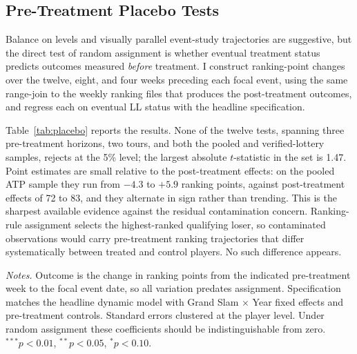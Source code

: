 \subsection{Pre-Treatment Placebo Tests}
\label{sec:robustness_placebo}

Balance on levels and visually parallel event-study trajectories are suggestive, but the direct test of random assignment is whether eventual treatment status predicts outcomes measured \textit{before} treatment. I construct ranking-point changes over the twelve, eight, and four weeks preceding each focal event, using the same range-join to the weekly ranking files that produces the post-treatment outcomes, and regress each on eventual LL status with the headline specification.

Table~\ref{tab:placebo} reports the results. None of the twelve tests, spanning three pre-treatment horizons, two tours, and both the pooled and verified-lottery samples, rejects at the 5\% level; the largest absolute $t$-statistic in the set is 1.47. Point estimates are small relative to the post-treatment effects: on the pooled ATP sample they run from $-4.3$ to $+5.9$ ranking points, against post-treatment effects of 72 to 83, and they alternate in sign rather than trending. This is the sharpest available evidence against the residual contamination concern. Ranking-rule assignment selects the highest-ranked qualifying loser, so contaminated observations would carry pre-treatment ranking trajectories that differ systematically between treated and control players. No such difference appears.

\begin{table}[htbp]
\centering
\caption{Pre-Treatment Placebo Tests}
\label{tab:placebo}
\begin{threeparttable}
\small

\begin{tablenotes}
\footnotesize
\item \textit{Notes.} Outcome is the change in ranking points from the indicated pre-treatment week to the focal event date, so all variation predates assignment. Specification matches the headline dynamic model with Grand Slam $\times$ Year fixed effects and pre-treatment controls. Standard errors clustered at the player level. Under random assignment these coefficients should be indistinguishable from zero. $^{***}p<0.01$, $^{**}p<0.05$, $^{*}p<0.10$.
\end{tablenotes}
\end{threeparttable}
\end{table}

